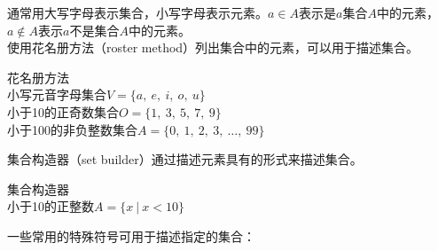 \documentclass[12pt, openany, oneside]{book}
\begin{document}
通常用大写字母表示集合，小写字母表示元素。$ a \in A $表示是$ a $集合$ A $中的元素，$ a \notin A $表示$ a $不是集合$ A $中的元素。 \\

使用花名册方法（roster method）列出集合中的元素，可以用于描述集合。

\begin{tcolorbox}
	花名册方法 \\
	小写元音字母集合$ V = \{a,\ e,\ i,\ o,\ u\} $ \\
	小于10的正奇数集合$ O = \{1,\ 3,\ 5,\ 7,\ 9\} $ \\
	小于100的非负整数集合$ A = \{0,\ 1,\ 2,\ 3,\ \dots,\ 99\} $
\end{tcolorbox}

集合构造器（set builder）通过描述元素具有的形式来描述集合。

\begin{tcolorbox}
	集合构造器 \\
	小于10的正整数$ A = \{x\ |\ x < 10\} $
\end{tcolorbox}

一些常用的特殊符号可用于描述指定的集合：

\begin{table}[H]
	\centering
\end{table}
\end{document}
